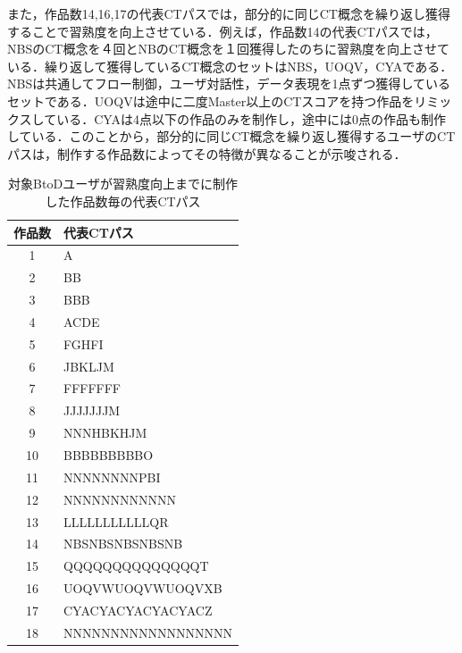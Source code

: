 \documentclass[11pt,dvipdfmx]{jreport}
\begin{document}
また，作品数14,16,17の代表CTパスでは，部分的に同じCT概念を繰り返し獲得することで習熟度を向上させている．例えば，作品数14の代表CTパスでは，NBSのCT概念を４回とNBのCT概念を１回獲得したのちに習熟度を向上させている．繰り返して獲得しているCT概念のセットはNBS，UOQV，CYAである．NBSは共通してフロー制御，ユーザ対話性，データ表現を1点ずつ獲得しているセットである．UOQVは途中に二度Master以上のCTスコアを持つ作品をリミックスしている．CYAは4点以下の作品のみを制作し，途中には0点の作品も制作している．このことから，部分的に同じCT概念を繰り返し獲得するユーザのCTパスは，制作する作品数によってその特徴が異なることが示唆される．


\begin{table}[h]
  \begin{minipage}[t]{0.45\linewidth} %
    \centering
    \caption{対象BtoDユーザが習熟度向上までに制作した作品数毎の代表CTパス}
    \label{tab:split-ct-btod}
    \vspace{2mm}
  \begin{tabular}{c|l}
    \hline
    作品数 & 代表CTパス\\
    \hline
    \hline
    1 & A \\
    \hline
    2 & BB \\
    \hline
    3 & BBB \\
    \hline
    4 & ACDE \\
    \hline
    5 & FGHFI \\
    \hline
    6 & JBKLJM \\
    \hline
    7 & FFFFFFF  \\
    \hline
    8 & JJJJJJJM \\
    \hline
    9 & NNNHBKHJM \\
    \hline
    10 & BBBBBBBBBO \\
    \hline
    11 & NNNNNNNNPBI \\
    \hline
    12 & NNNNNNNNNNNN \\
    \hline
    13 & LLLLLLLLLLLQR \\
    \hline
    14 & NBSNBSNBSNBSNB \\
    \hline
    15 & QQQQQQQQQQQQQQT \\
    \hline
    16 & UOQVWUOQVWUOQVXB \\
    \hline
    17 & CYACYACYACYACYACZ \\
    \hline
    18 & NNNNNNNNNNNNNNNNNN \\
    \hline
  \end{tabular}
  \end{minipage}%
  \begin{minipage}[t]{0.55\linewidth}

\end{minipage}
\end{table}
\end{document}
